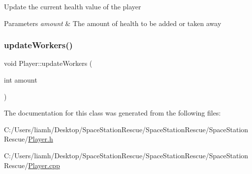 Update the current health value of the player 


\begin{DoxyParams}{Parameters}
{\em amount} & The amount of health to be added or taken away\\
\hline
\end{DoxyParams}
\mbox{\label{class_player_a1a6ae384266f1d99c9333a011d7259a5}} 
\subsubsection{\texorpdfstring{updateWorkers()}{updateWorkers()}}
{\footnotesize\ttfamily void Player\+::update\+Workers (\begin{DoxyParamCaption}\item[{int}]{amount }\end{DoxyParamCaption})}



The documentation for this class was generated from the following files\+:\begin{DoxyCompactItemize}
\item 
C\+:/\+Users/liamh/\+Desktop/\+Space\+Station\+Rescue/\+Space\+Station\+Rescue/\+Space\+Station\+Rescue/\mbox{\hyperlink{_player_8h}{Player.\+h}}\item 
C\+:/\+Users/liamh/\+Desktop/\+Space\+Station\+Rescue/\+Space\+Station\+Rescue/\+Space\+Station\+Rescue/\mbox{\hyperlink{_player_8cpp}{Player.\+cpp}}\end{DoxyCompactItemize}
